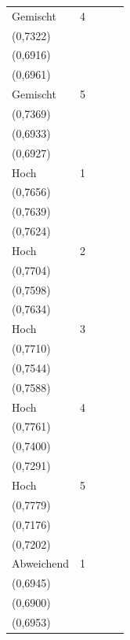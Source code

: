 {\begin{tabular}{llccc}
Gemischt & 4 & \shortstack{$0{,}5276 \pm 0{,}0953$\\(0{,}7322)} & \shortstack{$0{,}6498 \pm 0{,}0522$\\(0{,}6916)} & \shortstack{$0{,}6459 \pm 0{,}0582$\\(0{,}6961)} \\
Gemischt & 5 & \shortstack{$0{,}5133 \pm 0{,}1089$\\(0{,}7369)} & \shortstack{$0{,}6436 \pm 0{,}0526$\\(0{,}6933)} & \shortstack{$0{,}6500 \pm 0{,}0607$\\(0{,}6927)} \\
Hoch & 1 & \shortstack{$0{,}6863 \pm 0{,}0412$\\(0{,}7656)} & \shortstack{$0{,}6413 \pm 0{,}0370$\\(0{,}7639)} & \shortstack{$0{,}6531 \pm 0{,}0396$\\(0{,}7624)} \\
Hoch & 2 & \shortstack{$0{,}5495 \pm 0{,}0663$\\(0{,}7704)} & \shortstack{$0{,}6448 \pm 0{,}0396$\\(0{,}7598)} & \shortstack{$0{,}6350 \pm 0{,}0327$\\(0{,}7634)} \\
Hoch & 3 & \shortstack{$0{,}4794 \pm 0{,}0958$\\(0{,}7710)} & \shortstack{$0{,}6271 \pm 0{,}0361$\\(0{,}7544)} & \shortstack{$0{,}6199 \pm 0{,}0411$\\(0{,}7588)} \\
Hoch & 4 & \shortstack{$0{,}4115 \pm 0{,}1058$\\(0{,}7761)} & \shortstack{$0{,}5823 \pm 0{,}0795$\\(0{,}7400)} & \shortstack{$0{,}6006 \pm 0{,}0899$\\(0{,}7291)} \\
Hoch & 5 & \shortstack{$0{,}3948 \pm 0{,}1197$\\(0{,}7779)} & \shortstack{$0{,}6460 \pm 0{,}1603_{n=89}$\\(0{,}7176)} & \shortstack{$0{,}5854 \pm 0{,}1660_{n=96}$\\(0{,}7202)} \\
Abweichend & 1 & \shortstack{$0{,}6899 \pm 0{,}0488$\\(0{,}6945)} & \shortstack{$0{,}6865 \pm 0{,}0590$\\(0{,}6900)} & \shortstack{$0{,}6875 \pm 0{,}0456$\\(0{,}6953)} \\

\end{tabular}}
